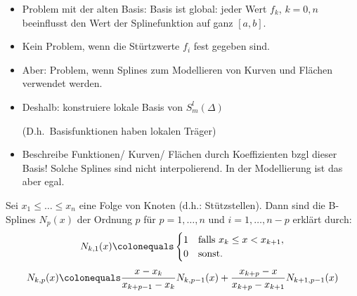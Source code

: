\begin{itemize}
  \item Problem mit der alten Basis: Basis ist global: jeder Wert $f_k$, $k=0, n$ beeinflusst den Wert der Splinefunktion auf ganz $\left[a,b\right]$.
  \item Kein Problem, wenn die Stürtzwerte $f_i$ fest gegeben sind.

  \item Aber: Problem, wenn Splines zum Modellieren von Kurven und Flächen verwendet werden.

  \item Deshalb: konstruiere lokale Basis von $S_m^l(\Delta)$

    (D.h.\ Basisfunktionen haben lokalen Träger)

  \item Beschreibe Funktionen/ Kurven/ Flächen durch Koeffizienten bzgl dieser Basis!
    Solche Splines sind nicht interpolierend. In der Modellierung ist das aber egal.
\end{itemize}

\begin{defi}
 Sei $x_1\leq \dots \leq x_n$ eine Folge von Knoten (d.h.: Stützstellen).
 Dann sind die B-Splines $N_p(x)$ der Ordnung $p$ für $p=1, \dots, n$ und $i=1, \dots, n-p$ erklärt durch:
 \begin{equation*}
  N_{k,1}(x)
  \colonequals
  \begin{cases}
   1 & \text{falls $x_k\leq x <x_{k+1}$},\\
   0 & \text{sonst.}\\
  \end{cases}
 \end{equation*}
 \begin{equation*}
  N_{k,p}(x)
   \colonequals
  \frac{x - x_k}{x_{k+p-1} - x_k}N_{k,p-1}(x) + \frac{x_{k+p} - x}{x_{k+p} - x_{k+1}}N_{k+1, p-1}(x)
 \end{equation*}
\end{defi}

